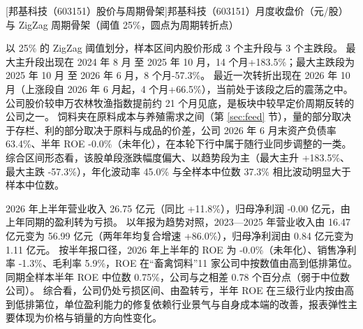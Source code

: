 \begin{center}
\begin{minipage}{\textwidth}\centering
{}

[邦基科技（603151）股价与周期骨架]{邦基科技（603151）月度收盘价（元/股）与 ZigZag 周期骨架（阈值 25\%，圆点为周期转折点）}
\end{minipage}
\end{center}

 以 25\% 的 ZigZag 阈值划分，样本区间内股价形成 3 个主升段与 3 个主跌段。 最大主升段出现在 2024 年 8 月 至 2025 年 10 月，14 个月+183.5\%；最大主跌段为 2025 年 10 月 至 2026 年 6 月，8 个月-57.3\%。 最近一次转折出现在 2026 年 10 月（上涨段自 2026 年 6 月起，4 个月+66.5\%），当前处于该段之后的震荡之中。 公司股价较申万农林牧渔指数提前约 21 个月见底，是板块中较早定价周期反转的公司之一。 饲料夹在原料成本与养殖需求之间（第 \ref{sec:feed} 节），量的部分取决于存栏、利的部分取决于原料与成品的价差，公司 2026 年 6 月末资产负债率 63.4\%、半年 ROE -0.0\%（未年化），在本轮下行中属于随行业同步调整的一类。 综合区间形态看，该股单段涨跌幅度偏大、以趋势段为主（最大主升 +183.5\%、最大主跌 -57.3\%），年化波动率 45.0\% 与全样本中位数 37.3\% 相比波动明显大于样本中位数。

 2026 年上半年营业收入 26.75 亿元（同比 +11.8\%），归母净利润 -0.00 亿元，由上年同期的盈利转为亏损。 以年报为趋势对照，2023---2025 年营业收入由 16.47 亿元变为 56.99 亿元（两年年均复合增速 +86.0\%），归母净利润由 0.84 亿元变为 1.11 亿元。 按半年报口径，2026 年上半年的 ROE 为 -0.0\%（未年化）、销售净利率 -1.3\%、毛利率 5.9\%，ROE 在“畜禽饲料”11 家公司中按数值由高到低排第位。 同期全样本半年 ROE 中位数 0.75\%，公司与之相差 0.78 个百分点（弱于中位数公司）。 综合看，公司仍处亏损区间、由盈转亏，半年 ROE 在三级行业内按由高到低排第位，单位盈利能力的修复依赖行业景气与自身成本端的改善，报表弹性主要体现为价格与销量的方向性变化。

